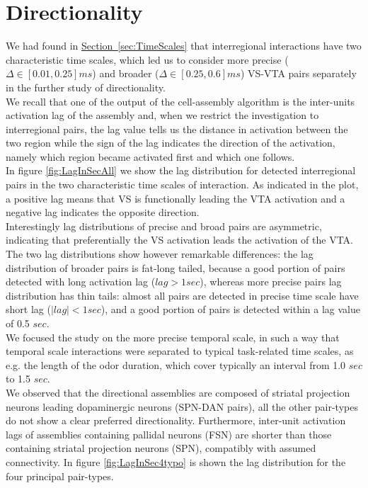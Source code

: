 \section{Directionality} 
\label{sec:Directionality}
We had found in \hyperref[sec:TimeScales]{Section~\ref*{sec:TimeScales}} that interregional interactions have two characteristic time scales, which led us to consider more precise ($\Delta \in [0.01,0.25] ms$) and broader ($\Delta \in [0.25,0.6] ms$) VS-VTA pairs separately in the further study of directionality.\\We recall that one of the output of the cell-assembly algorithm is the inter-units activation lag of the assembly and, when we restrict the investigation to interregional pairs, the lag value tells us the distance in activation between the two region while the sign of the lag indicates the direction of the activation, namely which region became activated first and which one follows.\\
In figure \ref{fig:LagInSecAll} we show the lag distribution for detected interregional pairs in the two characteristic time scales of interaction. As indicated in the plot, a positive lag means that VS is functionally leading the VTA activation and a negative lag indicates the opposite direction.\\Interestingly lag distributions of precise and broad pairs are asymmetric, indicating that preferentially the VS activation leads the activation of the VTA. The two lag distributions show however remarkable differences: the lag distribution of broader pairs is fat-long tailed, because a good portion of pairs detected with long activation lag ($lag > 1 sec$), whereas more precise pairs lag distribution has thin tails: almost all pairs are detected in precise time scale have short lag ($|lag| < 1 sec$), and a good portion of pairs is detected within a lag value of 0.5 $sec$.\\
We focused the study on the more precise temporal scale, in such a way that temporal scale interactions were separated to typical task-related time scales, as e.g. the length of the odor duration, which cover typically an interval from 1.0 $sec$ to 1.5 $sec$.\\
We observed that the directional assemblies are composed of striatal projection neurons leading dopaminergic neurons (SPN-DAN pairs), all the other pair-types do not show a clear preferred directionality. Furthermore, inter-unit activation lags of assemblies containing pallidal neurons (FSN) are shorter than those containing striatal projection neurons (SPN), compatibly with assumed connectivity. In figure \ref{fig:LagInSec4typo} is shown the lag distribution for the four principal pair-types.\\
